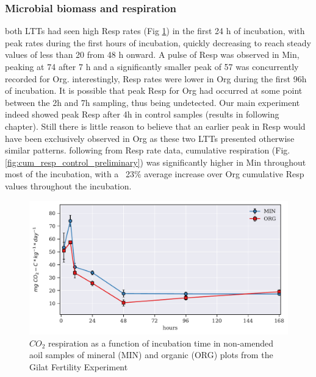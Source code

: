         \subsubsection{Microbial biomass and respiration}
            both LTTs had seen high Resp rates (Fig \ref{fig:resp_control_preliminary}) in the first 24 h of incubation, with peak rates during the first hours of incubation, quickly decreasing to reach steady values of less than 20 \respunit from 48 h onward. A pulse of Resp was observed in Min, peaking at 74   \respunit after 7 h and a significantly smaller peak of 57 \respunit was concurrently recorded for Org. interestingly, Resp rates were lower in Org during the first 96h of incubation. It is possible that peak Resp for Org had occurred at some point between the 2h and 7h  sampling, thus being undetected. Our main experiment indeed showed peak Resp after 4h in control samples (results in following chapter). Still there is little reason to believe that an earlier peak in Resp would have been exclusively observed in Org as these two LTTs presented otherwise similar patterns.
            following from Resp rate data, cumulative respiration (Fig. \ref{fig:cum_resp_control_preliminary}) was significantly higher in Min throughout most of the incubation, with a ~23$\%$ average increase over Org cumulative Resp values throughout the incubation.\\

  			 \begin{figure}[H]
  				\centering
  				\includegraphics[scale=0.8]{thesis_figures/preliminary/control/Resp.pdf}
  				\caption{$CO_2$ respiration as a function of incubation time in non-amended aoil samples of mineral (MIN) and organic (ORG) plots from the Gilat Fertility Experiment}
  				\label{fig:resp_control_preliminary}
  			\end{figure}

